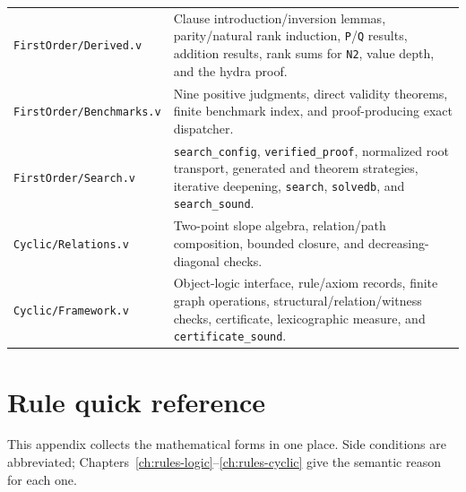 \documentclass[11pt,oneside]{book}
\DeclareRobustCommand{\code}[1]{\nolinkurl{#1}}
\DeclareRobustCommand{\file}[1]{\nolinkurl{#1}}
\begin{document}
\begin{longtable}{@{}p{}p{}@{}}
\addlinespace
\file{FirstOrder/Derived.v} & Clause introduction/inversion lemmas, parity/natural rank induction, \code{P}/\code{Q} results, addition results, rank sums for \code{N2}, value depth, and the hydra proof.\\
\addlinespace
\file{FirstOrder/Benchmarks.v} & Nine positive judgments, direct validity theorems, finite benchmark index, and proof-producing exact dispatcher.\\
\addlinespace
\file{FirstOrder/Search.v} & \code{search_config}, \code{verified_proof}, normalized root transport, generated and theorem strategies, iterative deepening, \code{search}, \code{solvedb}, and \code{search_sound}.\\
\addlinespace
\file{Cyclic/Relations.v} & Two-point slope algebra, relation/path composition, bounded closure, and decreasing-diagonal checks.\\
\addlinespace
\file{Cyclic/Framework.v} & Object-logic interface, rule/axiom records, finite graph operations, structural/relation/witness checks, certificate, lexicographic measure, and \code{certificate_sound}.\\
\bottomrule
\end{longtable}

\chapter{Rule quick reference}
\label{app:rules}

This appendix collects the mathematical forms in one place.  Side conditions
are abbreviated; Chapters~\ref{ch:rules-logic}--\ref{ch:rules-cyclic} give the
semantic reason for each one.
\end{document}
